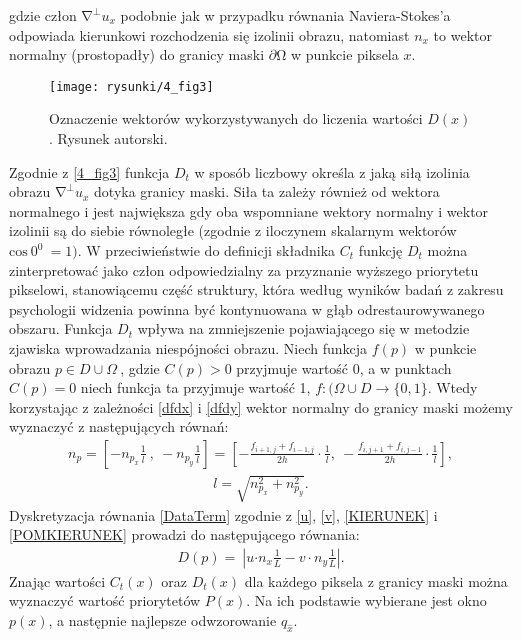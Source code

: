 \documentclass[a4paper,12pt,twoside,openany]{report}
\begin{document}
gdzie człon ${\mathrm{\nabla }}^{\bot }u_x$ podobnie jak w przypadku równania Naviera-Stokes'a odpowiada kierunkowi rozchodzenia się izolinii obrazu, natomiast  $n_x$ to wektor normalny (prostopadły) do granicy maski $\partial \mathrm{\Omega }$ w punkcie piksela $x$.
\begin{figure}[!h]
	\centering
	\texttt{[image: rysunki/4\_fig3]}
	\caption{Oznaczenie wektorów wykorzystywanych do liczenia wartości $D(x)$. Rysunek autorski.}
	\label{4_fig3} 
\end{figure}
Zgodnie z \autoref{4_fig3} funkcja $D_t$ w sposób liczbowy określa z jaką siłą izolinia obrazu ${\mathrm{\nabla }}^{\bot }u_x$ dotyka granicy maski. Siła ta zależy również od wektora normalnego i jest największa gdy oba wspomniane wektory normalny i wektor izolinii są do siebie równoległe (zgodnie z iloczynem skalarnym wektorów ${\mathrm{cos} \ 0^0\ }=1)$.
W przeciwieństwie do definicji składnika $C_t$ funkcję $D_t$ można zinterpretować jako człon odpowiedzialny za przyznanie wyższego priorytetu pikselowi, stanowiącemu część struktury, która według wyników badań z zakresu psychologii widzenia powinna być kontynuowana w głąb odrestaurowywanego obszaru. Funkcja $D_t$ wpływa na zmniejszenie pojawiającego się w metodzie zjawiska wprowadzania niespójności obrazu. Niech funkcja $f(p)$ w punkcie obrazu $p \in D \cup \Omega \ $, gdzie $C(p) > 0$ przyjmuje wartość 0, a w punktach $C(p) = 0$ niech funkcja ta przyjmuje wartość 1, $f : (\Omega \cup D \to \{0,1\}$.  Wtedy korzystając z zależności \eqref{dfdx} i \eqref{dfdy} wektor normalny do granicy maski możemy wyznaczyć z następujących równań:
\begin{align}
n_p= \left[-n_{p_x}\frac{1}{l}\ ,\ -n_{p_y} \frac{1}{l}\right] =\left[-\frac{f_{i+1,j}+f_{i-1,j}}{2h}\cdot \frac{1}{l}, \  -\frac{f_{i,j+1} + f_{i,j-1}}{2h} \cdot \frac{1}{l}\right],
\label{KIERUNEK}
\end{align}
\begin{align}
l= \sqrt{n^2_{p_x} + n^2_{p_y}}.
\label{POMKIERUNEK}
\end{align}
Dyskretyzacja równania \eqref{DataTerm} zgodnie z \eqref{u}, \eqref{v}, \eqref{KIERUNEK} i \eqref{POMKIERUNEK} prowadzi do następującego równania:
\begin{align}
D(p)=\ \left|u{\cdot n}_x\frac{1}{L}-v\cdot n_y\frac{1}{L}\right|.
\end{align}
Znając wartości $C_t\left(x\right)$ oraz $D_t(x)$ dla każdego piksela z granicy maski można wyznaczyć wartość priorytetów $P(x)$. Na ich podstawie wybierane jest okno $p(x)$, a następnie najlepsze odwzorowanie $q_{\hat{x}}$.
\end{document}
